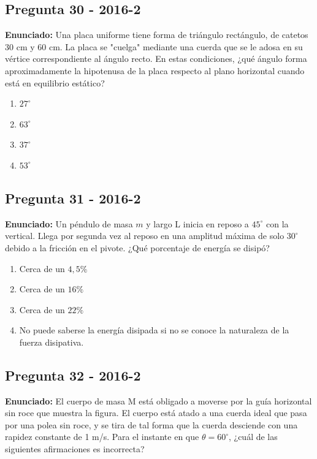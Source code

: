 \documentclass{article}
\begin{document}
\subsection*{Pregunta 30 - 2016-2}
\textbf{Enunciado:} Una placa uniforme tiene forma de triángulo rectángulo, de catetos 30 cm y 60 cm. La placa se "cuelga" mediante una cuerda que se le adosa en su vértice correspondiente al ángulo recto. En estas condiciones, ¿qué ángulo forma aproximadamente la hipotenusa de la placa respecto al plano horizontal cuando está en equilibrio estático?
\begin{enumerate}
    \item[a)] $27^\circ$
    \item[b)] $63^\circ$
    \item[c)] $37^\circ$
    \item[d)] $53^\circ$
\end{enumerate}
\vspace{0.5cm}

\subsection*{Pregunta 31 - 2016-2}
\textbf{Enunciado:} Un péndulo de masa $m$ y largo L inicia en reposo a $45^\circ$ con la vertical. Llega por segunda vez al reposo en una amplitud máxima de solo $30^\circ$ debido a la fricción en el pivote. ¿Qué porcentaje de energía se disipó?
\begin{enumerate}
    \item[a)] Cerca de un $4,5 \%$
    \item[b)] Cerca de un $16 \%$
    \item[c)] Cerca de un $22 \%$
    \item[d)] No puede saberse la energía disipada si no se conoce la naturaleza de la fuerza disipativa.
\end{enumerate}
\vspace{0.5cm}

\subsection*{Pregunta 32 - 2016-2}
\textbf{Enunciado:} El cuerpo de masa M está obligado a moverse por la guía horizontal sin roce que muestra la figura. El cuerpo está atado a una cuerda ideal que pasa por una polea sin roce, y se tira de tal forma que la cuerda desciende con una rapidez constante de 1 m/s. Para el instante en que $\theta=60^\circ$, ¿cuál de las siguientes afirmaciones es incorrecta?
\end{document}
